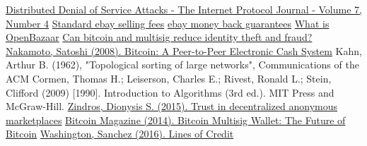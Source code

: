 \documentclass[11pt]{article}
\theoremstyle{definition}
\theoremstyle{corollary}
\theoremstyle{lemma}
\begin{document}
  \begin{thebibliography}{20}
     \href{http://www.cisco.com/c/en/us/about/press/internet-protocol-journal/back-issues/table-contents-30/dos-attacks.html}
           {Distributed Denial of Service Attacks - The Internet Protocol Journal - Volume 7, Number 4}
     \href{http://pages.ebay.com/help/sell/fees.html}{Standard ebay selling fees}
     \href{http://pages.ebay.com/ebay-money-back-guarantee/questions.html}{ebay money back guarantees}
     \href{https://blog.openbazaar.org/what-is-openbazaar/}{What is OpenBazaar}
     \href{https://blog.openbazaar.org/can-bitcoin-and-multisig-reduce-identity-theft-and-fraud/}{Can bitcoin and multisig
     reduce identity theft and fraud?}
     \href{https://bitcoin.org/bitcoin.pdf}{Nakamoto, Satoshi (2008). Bitcoin: A Peer-to-Peer Electronic Cash System}
     Kahn, Arthur B. (1962), "Topological sorting of large networks", Communications of the ACM
     Cormen, Thomas H.; Leiserson, Charles E.; Rivest, Ronald L.; Stein, Clifford (2009) [1990]. Introduction to Algorithms
     (3rd ed.). MIT Press and McGraw-Hill.
     \href{https://dionyziz.com/pseudonymous-trust-2.pdf}{Zindros, Dionysis S. (2015). Trust in decentralized anonymous
     marketplaces}
     \href{https://bitcoinmagazine.com/articles/multisig-future-bitcoin-1394686504}{Bitcoin Magazine (2014). Bitcoin Multisig
     Wallet: The Future of Bitcoin}
     \href{https://gist.github.com/drwasho/2c40b91e169f55988618#part-3-web-of-credit}{Washington, Sanchez (2016). Lines of
     Credit}
  \end{thebibliography}
\end{document}
